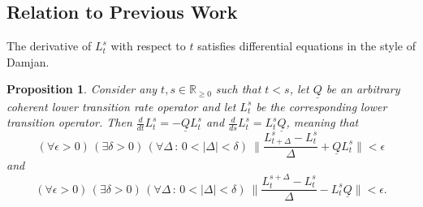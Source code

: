 \documentclass[10pt]{paper}
\newtheorem{proposition}[theorem]{Proposition}
\newcommand{\reals}{\mathbb{R}}
\newcommand{\realsnonneg}{\reals_{\geq 0}}
\newcommand{\lbound}{L}
\newcommand{\lrate}{\underline{Q}}
\begin{document}
\subsection{Relation to Previous Work}

The derivative of $\lbound_t^s$ with respect to $t$ satisfies differential equations in the style of Damjan.

\begin{proposition}
Consider any $t,s\in\realsnonneg$ such that $t<s$, let $\lrate$ be an arbitrary coherent lower transition rate operator and let $\lbound_t^s$ be the corresponding lower transition operator. Then $\frac{d}{dt}\lbound_t^s=-\lrate\lbound_t^s$ and $\frac{d}{ds}\lbound_t^s=\lbound_t^s\lrate$, meaning that
\begin{equation}\label{eq:lower_deriv_backward}
(\forall\epsilon>0)\,
(\exists\delta>0)\,
(\forall\Delta\,:\,0<\lvert\Delta\rvert <\delta)~
\Big\lVert\frac{L_{t+\Delta}^s-L_t^s}{\Delta}+\lrate L_t^s\Big\rVert<\epsilon
\end{equation}
and
\begin{equation}\label{eq:lower_deriv_forward}
(\forall\epsilon>0)\,
(\exists\delta>0)\,
(\forall\Delta\,:\,0<\lvert\Delta\rvert<\delta)~
\Big\lVert\frac{L_{t}^{s+\Delta}-L_t^s}{\Delta}-\lbound_t^s\lrate \Big\rVert<\epsilon.
\end{equation}
\end{proposition}
\end{document}
